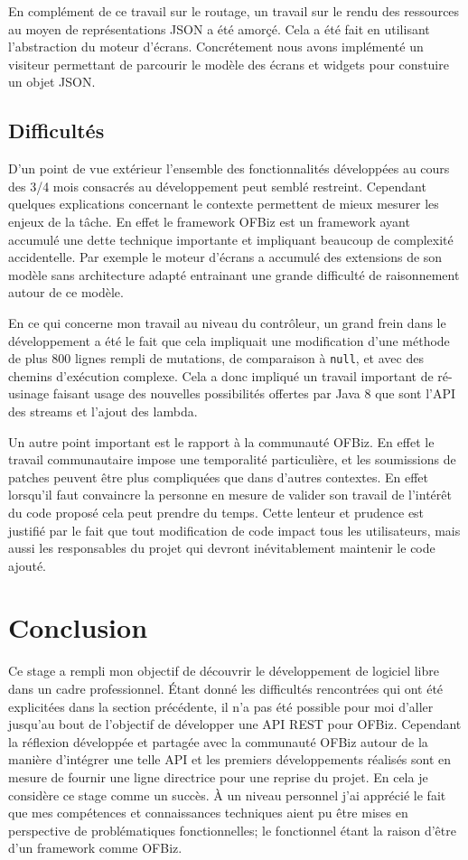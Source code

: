 \documentclass[a4paper, 11pt]{report}
\begin{document}
En complément de ce travail sur le routage, un travail sur le rendu
des ressources au moyen de représentations JSON a été amorçé. Cela a
été fait en utilisant l'abstraction du moteur d'écrans. Concrétement
nous avons implémenté un visiteur \cite{gamma1993design} permettant de
parcourir le modèle des écrans et widgets pour constuire un objet
JSON.

\section{Difficultés}

D'un point de vue extérieur l'ensemble des fonctionnalités développées
au cours des 3/4 mois consacrés au développement peut semblé
restreint.  Cependant quelques explications concernant le contexte
permettent de mieux mesurer les enjeux de la tâche. En effet le
framework OFBiz est un framework ayant accumulé une dette technique
importante et impliquant beaucoup de complexité accidentelle. Par
exemple le moteur d'écrans a accumulé des extensions de son modèle
sans architecture adapté entrainant une grande difficulté de
raisonnement autour de ce modèle.

En ce qui concerne mon travail au niveau du contrôleur, un grand frein
dans le développement a été le fait que cela impliquait une
modification d'une méthode de plus 800 lignes rempli de mutations, de
comparaison à \verb=null=, et avec des chemins d'exécution
complexe. Cela a donc impliqué un travail important de ré-usinage
faisant usage des nouvelles possibilités offertes par Java 8 que sont
l'API des streams et l'ajout des lambda.

Un autre point important est le rapport à la communauté OFBiz. En
effet le travail communautaire impose une temporalité particulière, et
les soumissions de patches peuvent être plus compliquées que dans
d'autres contextes.  En effet lorsqu'il faut convaincre la personne en
mesure de valider son travail de l'intérêt du code proposé cela peut
prendre du temps. Cette lenteur et prudence est justifié par le fait
que tout modification de code impact tous les utilisateurs, mais aussi
les responsables du projet qui devront inévitablement maintenir le
code ajouté.

\chapter{Conclusion}

Ce stage a rempli mon objectif de découvrir le développement de
logiciel libre dans un cadre professionnel. Étant donné les
difficultés rencontrées qui ont été explicitées dans la section
précédente, il n'a pas été possible pour moi d'aller jusqu'au bout de
l'objectif de développer une API REST pour OFBiz. Cependant la
réflexion développée et partagée avec la communauté OFBiz autour de la
manière d'intégrer une telle API et les premiers développements
réalisés sont en mesure de fournir une ligne directrice pour une
reprise du projet. En cela je considère ce stage comme un succès. À un
niveau personnel j'ai apprécié le fait que mes compétences et
connaissances techniques aient pu être mises en perspective de
problématiques fonctionnelles; le fonctionnel étant la raison d'être
d'un framework comme OFBiz.

\clearpage


\end{document}
